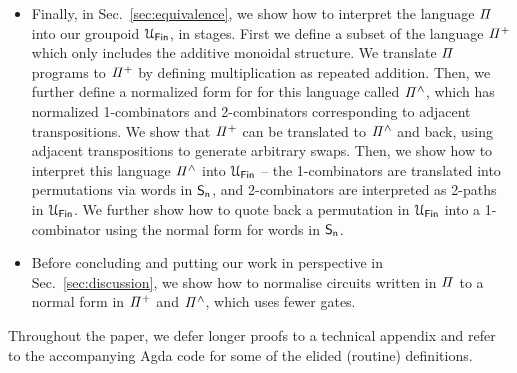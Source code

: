 \begin{itemize}[leftmargin=*]
\item Finally, in Sec.~\ref{sec:equivalence}, we show how to interpret the
  language $\mathit{\Pi}$ into our groupoid $\UFin$, in stages. First we define a
  subset of the language $\mathit{{\Pi}^{+}}$ which only includes the additive monoidal
  structure. We translate $\mathit{\Pi}$ programs to $\mathit{{\Pi}^{+}}$ by defining
  multiplication as repeated addition. Then, we further define a normalized form
  for for this language called $\mathit{{\Pi}^{\wedge}}$, which has normalized 1-combinators
  and 2-combinators corresponding to adjacent transpositions. We show that
  $\mathit{{\Pi}^{+}}$ can be translated to $\mathit{{\Pi}^{\wedge}}$ and back, using adjacent
  transpositions to generate arbitrary swaps. Then, we show how to interpret
  this language $\mathit{{\Pi}^{\wedge}}$ into $\UFin$ -- the 1-combinators are translated
  into permutations via words in $\Sn$, and 2-combinators are interpreted as
  2-paths in $\UFin$. We further show how to quote back a permutation in $\UFin$
  into a 1-combinator using the normal form for words in $\Sn$.
\item Before concluding and putting our work in perspective in
  Sec.~\ref{sec:discussion}, we show how to normalise circuits written in
  $\mathit{\Pi}$ to a normal form in $\mathit{{\Pi}^{+}}$ and $\mathit{{\Pi}^{\wedge}}$, which uses fewer
  gates.
\end{itemize}
Throughout the paper, we defer longer proofs to a technical appendix and refer
to the accompanying Agda code for some of the elided (routine) definitions.



